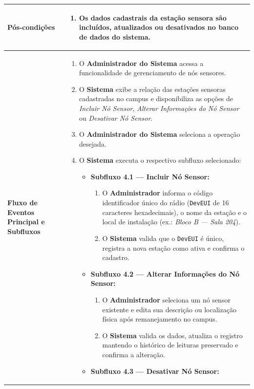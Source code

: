 \documentclass[11pt, a4paper]{article}
\begin{document}
\begin{longtable}{|>{\bfseries}p{3.8cm}|p{12.4cm}|}
Pós-condições & 
\begin{enumerate}[nosep, leftmargin=0.5cm]
    \item Os dados cadastrais da estação sensora são incluídos, atualizados ou desativados no banco de dados do sistema.
\end{enumerate} \\ \hline

Fluxo de Eventos Principal e Subfluxos & 
\begin{enumerate}[nosep, leftmargin=0.5cm]
    \item O \textbf{Administrador do Sistema} acessa a funcionalidade de gerenciamento de nós sensores.
    \item O \textbf{Sistema} exibe a relação das estações sensoras cadastradas no campus e disponibiliza as opções de \emph{Incluir Nó Sensor}, \emph{Alterar Informações do Nó Sensor} ou \emph{Desativar Nó Sensor}.
    \item O \textbf{Administrador do Sistema} seleciona a operação desejada.
    \item O \textbf{Sistema} executa o respectivo subfluxo selecionado:
    \begin{itemize}[nosep, leftmargin=0.5cm]
        \item \textbf{Subfluxo 4.1 --- Incluir Nó Sensor:}
        \begin{enumerate}[nosep, leftmargin=0.5cm]
            \item O \textbf{Administrador} informa o código identificador único do rádio (\texttt{DevEUI} de 16 caracteres hexadecimais), o nome da estação e o local de instalação (ex.: \emph{Bloco B --- Sala 204}).
            \item O \textbf{Sistema} valida que o \texttt{DevEUI} é único, registra a nova estação como ativa e confirma o cadastro.
        \end{enumerate}
        \item \textbf{Subfluxo 4.2 --- Alterar Informações do Nó Sensor:}
        \begin{enumerate}[nosep, leftmargin=0.5cm]
            \item O \textbf{Administrador} seleciona um nó sensor existente e edita sua descrição ou localização física após remanejamento no campus.
            \item O \textbf{Sistema} valida os dados, atualiza o registro mantendo o histórico de leituras preservado e confirma a alteração.
        \end{enumerate}
        \item \textbf{Subfluxo 4.3 --- Desativar Nó Sensor:}

\end{itemize}
\end{enumerate}
\end{longtable}
\end{document}
